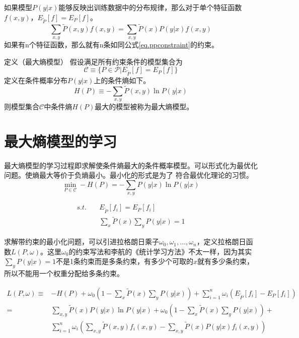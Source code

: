 \documentclass{article}
\begin{document}
	    如果模型$ P(y|x) $能够反映出训练数据中的分布规律，那么对于单个特征函数$f(x,y)$，$E_{\tilde{P}}[f]=E_{P}[f]$。
	\begin{equation}
		\sum_{x,y}\tilde{P}(x,y)f(x,y)=\sum_{x,y}\tilde{P}(x)P(y|x)f(x,y) \label{eq.ppconstraint}
	\end{equation}
	    如果有n个特征函数，那么就有n条如同公式\ref{eq.ppconstraint}的约束。
	
	    定义（最大熵模型）  假设满足所有约束条件的模型集合为
	\begin{equation}
		\mathcal{C}\equiv\{P\in\mathcal{P}|E_{\tilde{P}}[f]=E_{P}[f]\}
	\end{equation}
	    定义在条件概率分布$P(y|x)$上的条件熵如下。
	\begin{equation}
		H(P)\equiv-\sum_{x,y}\tilde{P}(x,y)\ln{P(y|x)}
	\end{equation}
	    则模型集合$ \mathcal{C} $中条件熵$ H(P)$最大的模型被称为最大熵模型。
	
	
	\section{最大熵模型的学习}
	    最大熵模型的学习过程即求解使条件熵最大的条件概率模型。可以形式化为最优化问题。使熵最大等价于负熵最小。最小化的形式是为了
	符合最优化理论的习惯。
	\begin{equation}
		\min_{P\in\mathcal{C}} -H(P) = -\sum_{x,y}P(y|x)\ln{P(y|x)}
	\end{equation}

	\begin{equation}
		\begin{aligned}
			s.t. \quad& E_{\tilde{P}}[f_{i}]=E_{P}[f_{i}]\\
			&\sum_{x}\tilde{P}(x)\sum_{y}P(y|x)=1
		\end{aligned}
    \end{equation}
      	
      	求解带约束的最小化问题，可以引进拉格朗日乘子$ \omega_{0}, \omega_{1},..., \omega_{n} $，定义拉格朗日函数$ L(P,\omega) $。这里$\omega_{0}$的约束写法和李航的《统计学习方法》不太一样，因为其实$\sum_{y}P(y|x)=1$不是1条约束而是多条约束，有多少个可取的$x$就有多少条约束，所以不能用一个权重分配给多条约束。
	
	\begin{equation}
		\begin{aligned}
		L(P,\omega) \equiv&-H(P)+\omega_{0}(1-\sum_{x}\tilde{P}(x)\sum_{y}P(y|x))+\sum_{i=1}^{n}\omega_{i}(E_{\tilde{P}}[f_{i}]-E_{P}[f_{i}])\\
		=&\sum_{x,y}\tilde{P}(x)P(y|x)\ln{P(y|x)}+\omega_{0}(1-\sum_{x}\tilde{P}(x)\sum_{y}P(y|x))+\\
		&\sum_{i=1}^{n}\omega_{i}(\sum_{x,y}\tilde{P}(x,y)f_{i}(x,y)-\sum_{x,y}\tilde{P}(x)P(y|x)f_{i}(x,y))	
		\end{aligned}
	\end{equation}\label{eq.Lagrange}
\end{document}
